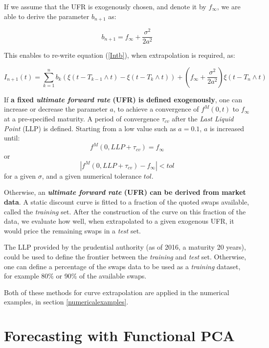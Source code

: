 If we assume that the UFR is exogenously chosen, and denote it by $f_\infty$, we are able to derive the parameter $b_{n+1}$ as:

\begin{equation}
b_{n+1} = f_\infty + \frac{\sigma^2}{2a^2}
\end{equation}

This enables to re-write equation (\ref{Intb}), when extrapolation is required, as:

\begin{equation}
\label{Intbbis}
I_{n+1}(t) = \sum_{k=1}^n b_k \left( \xi(t - T_{k-1} \wedge t) -  \xi(t - T_k \wedge t) \right) + \left(f_\infty + \frac{\sigma^2}{2a^2} \right) \xi(t - T_n \wedge t)
\end{equation}

If \textbf{a fixed \textit{ultimate forward rate} (UFR) is defined exogenously}, one can increase or decrease the parameter $a$, to achieve a convergence of $f^M(0, t)$ to $f_\infty$ at a pre-specified maturity. A period of convergence $\tau_{cv}$ after the  \textit{Last Liquid Point} (LLP) is defined. Starting from a low value such as $a = 0.1$, $a$ is increased until:
$$
f^M(0, LLP+\tau_{cv}) = f_\infty
$$
or
$$
|f^M(0, LLP+\tau_{cv}) - f_\infty| < tol
$$
for a given $\sigma$, and a given numerical tolerance $tol$.

\medskip

Otherwise, an \textbf{\textit{ultimate forward rate} (UFR) can be derived from market data}. A static discount curve is fitted to a fraction of the quoted swaps available, called the \textit{training} set. After the construction of the curve on this fraction of the data, we evaluate how well, when extrapolated to a given exogenous UFR, it would price the remaining swaps in a \textit{test} set.

\medskip

The LLP provided by the prudential authority (as of 2016, a maturity 20 years), could be used to define the frontier between the \textit{training} and \textit{test} set. Otherwise,  one can define a percentage of the swaps data to be used as a \textit{training} dataset, for example 80\% or 90\% of the available swaps.

\medskip

Both of these methods for curve extrapolation are applied in the numerical examples, in section \ref{numericalexamples}.

\section{Forecasting with Functional PCA}
\label{curvesforecast}

